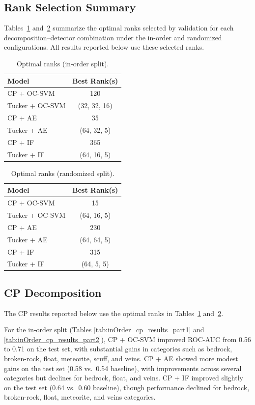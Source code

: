 \documentclass[11pt]{article}
\begin{document}
\subsection{Rank Selection Summary}
Tables~\ref{tab:best_ranks_inorder} and~\ref{tab:best_ranks_random} summarize the optimal ranks selected by validation for each decomposition–detector combination under the in-order and randomized configurations. All results reported below use these selected ranks.

\begin{table}[h!]
\centering
\begin{tabular}{lc}
\hline
\textbf{Model} & \textbf{Best Rank(s)} \\
\hline
CP + OC-SVM    & 120 \\
Tucker + OC-SVM& (32, 32, 16) \\
CP + AE        & 35 \\
Tucker + AE    & (64, 32, 5) \\
CP + IF        & 365 \\
Tucker + IF    & (64, 16, 5) \\
\hline
\end{tabular}
\caption{Optimal ranks (in-order split).}
\label{tab:best_ranks_inorder}
\end{table}

\begin{table}[h!]
\centering
\begin{tabular}{lc}
\hline
\textbf{Model} & \textbf{Best Rank(s)} \\
\hline
CP + OC-SVM    & 15 \\
Tucker + OC-SVM& (64, 16, 5) \\
CP + AE        & 230 \\
Tucker + AE    & (64, 64, 5) \\
CP + IF        & 315 \\
Tucker + IF    & (64, 5, 5) \\
\hline
\end{tabular}
\caption{Optimal ranks (randomized split).}
\label{tab:best_ranks_random}
\end{table}

\subsection{CP Decomposition}
The CP results reported below use the optimal ranks in Tables~\ref{tab:best_ranks_inorder} and~\ref{tab:best_ranks_random}.  

For the in-order split (Tables \ref{tab:inOrder_cp_results_part1} and \ref{tab:inOrder_cp_results_part2}), CP + OC-SVM improved ROC-AUC from 0.56 to 0.71 on the test set, with substantial gains in categories such as bedrock, broken-rock, float, meteorite, scuff, and veins. CP + AE showed more modest gains on the test set (0.58 vs.\ 0.54 baseline), with improvements across several categories but declines for bedrock, float, and veins. CP + IF improved slightly on the test set (0.64 vs.\ 0.60 baseline), though performance declined for bedrock, broken-rock, float, meteorite, and veins categories.  
\end{document}
